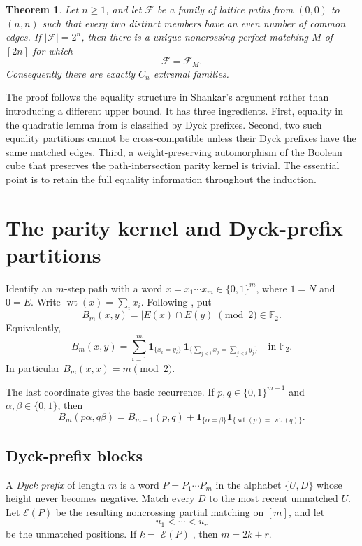 \documentclass[11pt]{article}
\newtheorem{theorem}{Theorem}[section]
\theoremstyle{definition}
\newcommand{\F}{\mathbb F}
\newcommand{\wt}{\operatorname{wt}}
\newcommand{\ind}[1]{\mathbf 1_{\{#1\}}}
\newcommand{\E}{\mathcal E}
\newcommand{\bits}{\{0,1\}}
\begin{document}
\begin{theorem}\label{thm:main}
Let $n\ge1$, and let $\mathcal F$ be a family of lattice paths from $(0,0)$ to $(n,n)$ such that every two distinct members have an even number of common edges.  If $|\mathcal F|=2^n$, then there is a unique noncrossing perfect matching $M$ of $[2n]$ for which
\[
 \mathcal F=\mathcal F_M.
\]
Consequently there are exactly $C_n$ extremal families.
\end{theorem}

The proof follows the equality structure in Shankar's argument rather than introducing a different upper bound.  It has three ingredients.  First, equality in the quadratic lemma from \cite{Shankar} is classified by Dyck prefixes.  Second, two such equality partitions cannot be cross-compatible unless their Dyck prefixes have the same matched edges.  Third, a weight-preserving automorphism of the Boolean cube that preserves the path-intersection parity kernel is trivial.  The essential point is to retain the full equality information throughout the induction.

\section{The parity kernel and Dyck-prefix partitions}

Identify an $m$-step path with a word $x=x_1\cdots x_m\in\bits^m$, where $1=N$ and $0=E$.  Write $\wt(x)=\sum_i x_i$.  Following \cite{Shankar}, put
\[
 B_m(x,y)=|E(x)\cap E(y)|\pmod 2\in\F_2.
\]
Equivalently,
\begin{equation}\label{eq:Bdef}
 B_m(x,y)=
 \sum_{i=1}^m
 \ind{x_i=y_i}\,
 \ind{\sum_{j<i}x_j=\sum_{j<i}y_j}
 \quad\text{in }\F_2.
\end{equation}
In particular $B_m(x,x)=m\pmod2$.

The last coordinate gives the basic recurrence.  If $p,q\in\bits^{m-1}$ and $\alpha,\beta\in\bits$, then
\begin{equation}\label{eq:recurrence}
 B_m(p\alpha,q\beta)
 =B_{m-1}(p,q)
  +\ind{\alpha=\beta}\ind{\wt(p)=\wt(q)}.
\end{equation}

\subsection{Dyck-prefix blocks}

A \emph{Dyck prefix} of length $m$ is a word $P=P_1\cdots P_m$ in the alphabet $\{U,D\}$ whose height never becomes negative.  Match every $D$ to the most recent unmatched $U$.  Let $\E(P)$ be the resulting noncrossing partial matching on $[m]$, and let
\[
 u_1<\cdots<u_r
\]
be the unmatched positions.  If $k=|\E(P)|$, then $m=2k+r$.
\end{document}
